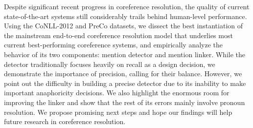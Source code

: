 Despite significant recent progress in coreference resolution, the quality of current state-of-the-art systems still considerably trails behind human-level performance. Using the CoNLL-2012 and PreCo datasets, we dissect the best instantiation of the mainstream end-to-end coreference resolution model that underlies most current best-performing coreference systems, and empirically analyze the behavior of its two components: mention detector and mention linker. While the detector traditionally focuses heavily on recall as a design decision, we demonstrate the importance of precision, calling for their balance. However, we point out the difficulty in building a precise detector due to its inability to make important anaphoricity decisions. We also highlight the enormous room for improving the linker and show that the rest of its errors mainly involve pronoun resolution. We propose promising next steps and hope our findings will help future research in coreference resolution.
